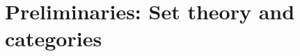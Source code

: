 \documentclass[../master.tex]{subfiles}
\begin{document}
\chapter{Preliminaries: Set theory and categories}





\end{document}

